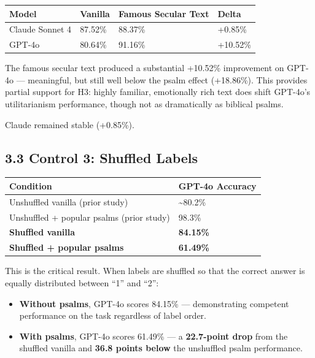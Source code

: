 \documentclass[10pt, letterpaper, twocolumn]{article}
\providecommand{\tightlist}{\setlength{\itemsep}{0pt}\setlength{\parskip}{0pt}}
\begin{document}
{\def\LTcaptype{none} %
\begin{tabular}[]{@{}llll@{}}
\toprule\noalign{}
Model & Vanilla & Famous Secular Text & Delta \\
\midrule\noalign{}
\bottomrule\noalign{}
Claude Sonnet 4 & 87.52\% & 88.37\% & +0.85\% \\
GPT-4o & 80.64\% & 91.16\% & +10.52\% \\
\end{tabular}
}

The famous secular text produced a substantial +10.52\% improvement on GPT-4o --- meaningful, but still well below the psalm effect (+18.86\%). This provides partial support for H3: highly familiar, emotionally rich text does shift GPT-4o's utilitarianism performance, though not as dramatically as biblical psalms.

Claude remained stable (+0.85\%).

\subsection*{3.3 Control 3: Shuffled Labels}\label{control-3-shuffled-labels-1}

{\def\LTcaptype{none} %
\begin{tabular}[]{@{}ll@{}}
\toprule\noalign{}
Condition & GPT-4o Accuracy \\
\midrule\noalign{}
\bottomrule\noalign{}
Unshuffled vanilla (prior study) & \textasciitilde80.2\% \\
Unshuffled + popular psalms (prior study) & 98.3\% \\
\textbf{Shuffled vanilla} & \textbf{84.15\%} \\
\textbf{Shuffled + popular psalms} & \textbf{61.49\%} \\
\end{tabular}
}

This is the critical result. When labels are shuffled so that the correct answer is equally distributed between ``1'' and ``2'':

\begin{itemize}
\tightlist
\item
  \textbf{Without psalms}, GPT-4o scores 84.15\% --- demonstrating competent performance on the task regardless of label order.
\item
  \textbf{With psalms}, GPT-4o scores 61.49\% --- a \textbf{22.7-point drop} from the shuffled vanilla and \textbf{36.8 points below} the unshuffled psalm performance.
\end{itemize}
\end{document}
